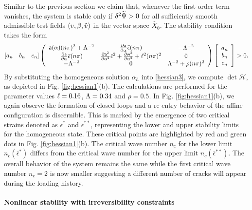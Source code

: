 \documentclass[10pt]{article}
\begin{document}
Similar to the previous section we claim that, whenever the first order term vanishes, the system is stable only if $\delta^2 \Ecompl
%
>0$ for all sufficiently smooth admissible test fields $(v, \beta, \tilde v)$ in the vector space $\widetilde{ X_0}$. The stability condition  takes the form
\begin{align}
    \left[ a_n \quad b_n \quad c_n \right]\left(
\begin{array}{ccc}
\mathsf{a}(\alpha)(n\pi)^2+\Lambda^{-2}& \frac{\partial \mathsf{a}}{\partial \alpha}\bar\epsilon(n\pi) &  -\Lambda^{-2} \\
\frac{\partial \mathsf{a}}{\partial \alpha}\bar\epsilon(n\pi) & \frac{\partial \mathsf{a}^2}{\partial \alpha^2}\bar\epsilon^2+ \frac{\partial \mathsf{w}^2}{\partial \alpha^2}+\ell^2(n\pi)^2 & 0 \\
 -\Lambda^{-2} & 0 & \Lambda^{-2} +\rho (n\pi)^2\\
\end{array}
\right)\left[ \begin{array}{c} a_n \\ b_n \\c_n \end{array} \right]>0.\label{hessian3}\end{align}
By substituting the homogeneous solution $\alpha_h$ into \eqref{hessian3}, we compute $\det \mathcal{H}$, as depicted  in Fig. \ref{fig:hessian1}(b). The calculations are performed for the parameter values $\ell=0.16$, $\Lambda=0.34$ and $\rho=0.5$.  In Fig. \ref{fig:hessian1}(b), we again observe the formation of closed loops and a re-entry behavior of the affine configuration is discernible. This is marked by the emergence of two critical strains denoted as $\bar\epsilon^*$ and $\bar\epsilon^{**}$, representing the lower and upper stability limits for the homogeneous state. These critical points are highlighted by red and green dots in Fig. \ref{fig:hessian1}(b). The critical wave number $n_c$ for the lower limit $n_c(\bar{\epsilon}^*)$    differs from the critical wave number for the upper limit $n_c(\bar{\epsilon}^{**})$. The overall behavior of the system remains the same while the first critical wave number $n_c=2$ is now smaller suggesting a different number of cracks will appear during the loading history.




%

\paragraph{Nonlinear stability with irreversibility constraints}
\end{document}

